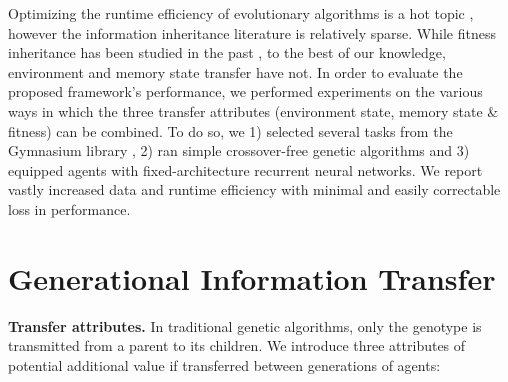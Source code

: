 \documentclass[dvipsnames,format=sigconf,anonymous=false,review=false]{acmart}
\begin{document}
Optimizing the runtime efficiency of evolutionary algorithms is a hot topic \cite{evotorch2023arxiv, chalumeau2023qdax, evojax2022}, however the information inheritance literature is relatively sparse. While fitness inheritance has been studied in the past \cite{smith1995fitness}, to the best of our knowledge, environment and memory state transfer have not. In order to evaluate the proposed framework's performance, we performed experiments on the various ways in which the three transfer attributes (environment state, memory state \& fitness) can be combined. To do so, we 1) selected several tasks from the Gymnasium library \cite{towers_gymnasium_2023},  2) ran simple crossover-free genetic algorithms and 3) equipped agents with fixed-architecture recurrent neural networks. We report vastly increased data and runtime efficiency with minimal and easily correctable loss in performance.

\section{Generational Information Transfer} \label{methods}

\textbf{Transfer attributes.} In traditional genetic algorithms, only the genotype is transmitted from a parent to its children. We introduce three attributes of potential additional value if transferred between generations of agents:
\end{document}

